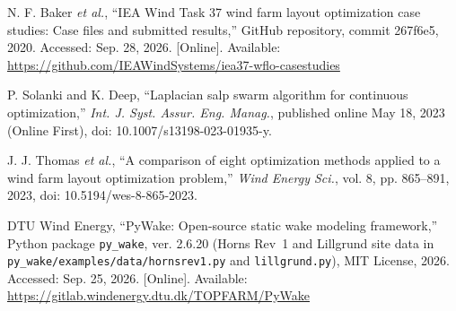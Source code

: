 N. F. Baker \textit{et al.}, ``IEA Wind Task 37 wind farm layout optimization case studies: Case files and submitted results,'' GitHub repository, commit 267f6e5, 2020. Accessed: Sep. 28, 2026. [Online]. Available: \url{https://github.com/IEAWindSystems/iea37-wflo-casestudies}


 P. Solanki and K. Deep, ``Laplacian salp swarm algorithm for continuous optimization,'' \textit{Int. J. Syst. Assur. Eng. Manag.}, published online May 18, 2023 (Online First), doi: 10.1007/s13198-023-01935-y.

J. J. Thomas \textit{et al.}, ``A comparison of eight optimization methods applied to a wind farm layout optimization problem,'' \textit{Wind Energy Sci.}, vol. 8, pp. 865--891, 2023, doi: 10.5194/wes-8-865-2023.

 DTU Wind Energy, ``PyWake: Open-source static wake modeling framework,'' Python package \texttt{py\_wake}, ver. 2.6.20 (Horns Rev~1 and Lillgrund site data in \texttt{py\_wake/examples/data/hornsrev1.py} and \texttt{lillgrund.py}), MIT License, 2026. Accessed: Sep. 25, 2026. [Online]. Available: \url{https://gitlab.windenergy.dtu.dk/TOPFARM/PyWake}

